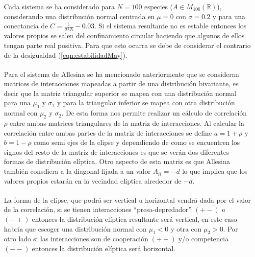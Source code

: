 Cada sistema se ha considerado para $N=100$ especies ($A\in M_{100}(\mathbb{R})$), considerando una distribución normal centrada en $\mu=0$ con $\sigma=0.2$ y para una conectancia de $C=\frac{1}{\sigma^2 N}-0.03$. Si el sistema resultante no es estable entonces los valores propios se salen del confinamiento circular haciendo que algunos de ellos tengan parte real positiva. Para que esto ocurra se debe de considerar el contrario de la desigualdad (\ref{eqn:estabilidadMay}). \\
\\
Para el sistema de Allesina \cite{allesina2012stability} se ha mencionado anteriormente que se consideran matrices de interacciones mapeadas a partir de una distribución bivariante, es decir que la matriz triangular superior se mapea con una distribución normal para una $\mu_1$ y $\sigma_1$ y para la triangular inferior se mapea con otra distribución normal con $\mu_2$ y $\sigma_2$. De esta forma nos permite realizar un cálculo de correlación $\rho$ entre ambas matrices triangulares de la matriz de interacciones. Al calcular la correlación entre ambas partes de la matriz de interacciones se define $a=1+\rho$ y $b=1-\rho$ como semi ejes de la elipse y dependiendo de como se encuentren los signos del resto de la matriz de interacciones es que se verán dos diferentes formas de distribución elíptica. Otro aspecto de esta matriz es que Allesina también consdiera a la diagonal fijada a un valor $A_{ii}= -d$ lo que implica que los valores propios estarán en la vecindad elíptica alrededor de $-d$.
\\
\\
La forma de la elipse, que podrá ser vertical u horizontal vendrá dada por el valor de la correlación, si se tienen interacciones ``presa-depredador'' $(+-)$ o $(-+)$ entonces la distribución elíptica resultante será vertical, en este caso habría que escoger una distribución normal con $\mu_1<0$ y otra con $\mu_2>0$. Por otro lado si las interacciones son de cooperación $(++)$ y/o competencia $(--)$ entonces la distribución elíptica será horizontal.

